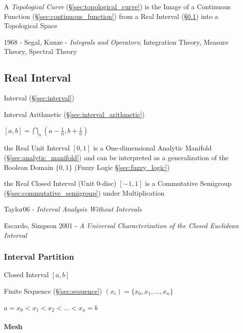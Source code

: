 A \emph{Topological Curve} (\S\ref{sec:topological_curve}) is the Image of a
Continuous Function (\S\ref{sec:continuous_function}) from a Real Interval
(\S\ref{sec:real_interval}) into a Topological Space

1968 - Segal, Kunze - \emph{Integrals and Operators}; Integration Theory,
Measure Theory, Spectral Theory



\subsection{Real Interval}\label{sec:real_interval}

Interval (\S\ref{sec:interval})

Interval Arithmetic (\S\ref{sec:interval_arithmetic})

$[a,b] = \bigcap_n (a - \frac{1}{n}, b + \frac{1}{n})$

the Real Unit Interval $[0,1]$ is a One-dimensional Analytic Manifold
(\S\ref{sec:analytic_manifold}) and can be interpreted as a generalization of
the Boolean Domain $\{0, 1\}$ (Fuzzy Logic \S\ref{sec:fuzzy_logic})

the Real Closed Interval (Unit 0-disc) $[-1,1]$ is a Commutative Semigroup
(\S\ref{sec:commutative_semigroup}) under Multiplication

Taylor06 - \emph{Interval Analysis Without Intervals}

Escardo, Simpson 2001 - \emph{A Universal Characterization of the Closed
Euclidean Interval}



\subsubsection{Interval Partition}\label{sec:interval_partition}

Closed Interval $[a,b]$

Finite Sequence (\S\ref{sec:sequence}) $(x_i) = \{ x_0, x_1, \ldots,
x_n \}$

$a = x_0 < x_1 < x_2 < \ldots < x_n = b$



\paragraph{Mesh}\label{sec:mesh}\hfill

